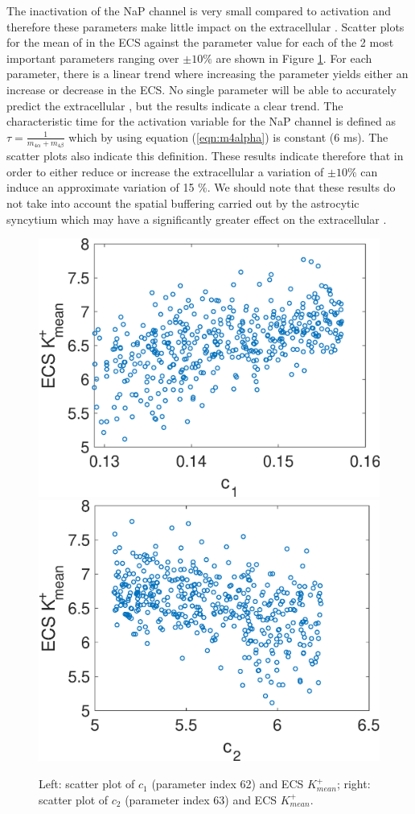 The inactivation of the NaP channel is very small compared to activation and therefore these parameters make little impact on the extracellular \pot. 
Scatter plots for the mean of \pot in the  ECS against the parameter value for each of the 2 most important parameters ranging over $\pm 10\%$  are shown in Figure \ref{fig:scatter}.  For each parameter, there is a linear trend where increasing the parameter yields either an increase or decrease in the \pot ECS. No single parameter will be able to accurately predict the extracellular \pot, but the results indicate a clear trend. The characteristic time for the activation variable for the NaP channel is defined as $\tau=\frac{1}{m_{4 \alpha}+m_{4 \beta}}$ which by using equation (\ref{eqn:m4alpha}) is constant (6 ms). The scatter plots also indicate this definition. These results indicate therefore that in order to either reduce or increase the extracellular \pot a variation of $\pm 10 \%$ can induce an approximate variation of 15 $\%$. We should note that these results do not take into account the spatial buffering carried out by the astrocytic syncytium which may have a significantly greater effect on the extracellular \pot. 
\begin{figure}
\centering
\includegraphics[width=0.49\linewidth]{Figures/Scatter_62_K_ECS}
\includegraphics[width=0.49\linewidth]{Figures/Scatter_63_K_ECS}
\caption{Left: scatter plot of $c_1$ (parameter index 62) and ECS $K^+_{mean}$; right: scatter plot of $c_2$ (parameter index 63) and ECS $K^+_{mean}$.}
\label{fig:scatter}
\end{figure}
